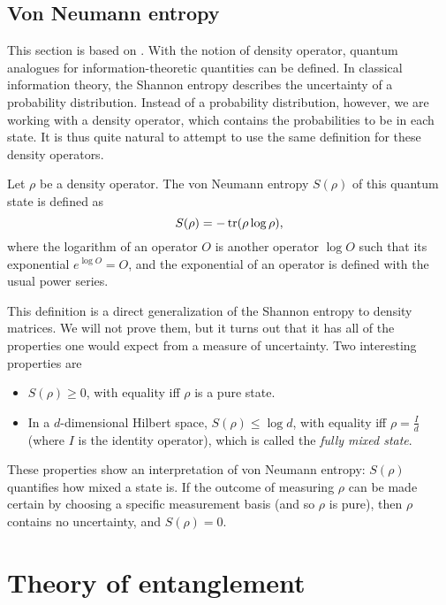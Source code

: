\subsection{Von Neumann entropy}

This section is based on \cite[pp. 510--527]{nielsen_quantum_2010}. With the notion of density operator, quantum analogues for information-theoretic quantities can be defined. In classical information theory, the Shannon entropy describes the uncertainty of a probability distribution. Instead of a probability distribution, however, we are working with a density operator, which contains the probabilities to be in each state. It is thus quite natural to attempt to use the same definition for these density operators.

\begin{definition}
    Let $\rho$ be a density operator. The von Neumann entropy $S(\rho)$ of this quantum state is defined as
    \begin{equation}
        S(\rho) = - \operatorname{tr}(\rho \log \rho),
    \end{equation}
    where the logarithm of an operator $O$ is another operator $\log O$ such that its exponential $e^{\log O} = O$, and the exponential of an operator is defined with the usual power series.
\end{definition}

This definition is a direct generalization of the Shannon entropy to density matrices. We will not prove them, but it turns out that it has all of the properties one would expect from a measure of uncertainty. Two interesting properties are

\begin{itemize}
    \item $S(\rho) \geq 0$, with equality iff $\rho$ is a pure state.
    \item In a $d$-dimensional Hilbert space, $S(\rho) \leq \log d$, with equality iff $\rho = \frac{I}{d}$ (where $I$ is the identity operator), which is called the \textit{fully mixed state}.
\end{itemize}

These properties show an interpretation of von Neumann entropy: $S(\rho)$ quantifies how mixed a state is. If the outcome of measuring $\rho$ can be made certain by choosing a specific measurement basis (and so $\rho$ is pure), then $\rho$ contains no uncertainty, and $S(\rho) = 0$.



\section{Theory of entanglement} \label{sec:entanglement}

